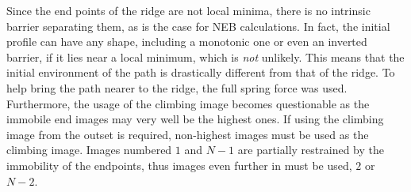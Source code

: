 Since the end points of the ridge are not local minima, there is no intrinsic barrier separating them, as is the case for NEB calculations.
In fact, the initial profile can have any shape, including a monotonic one or even an inverted barrier, if it lies near a local minimum, which is \emph{not} unlikely.
This means that the initial environment of the path is drastically different from that of the ridge.
To help bring the path nearer to the ridge, the full spring force was used.
Furthermore, the usage of the climbing image becomes questionable as the immobile end images may very well be the highest ones.
If using the climbing image from the outset is required, non-highest images must be used as the climbing image.
Images numbered $1$ and $N-1$ are partially restrained by the immobility of the endpoints, thus images even further in must be used, $2$ or $N-2$.

